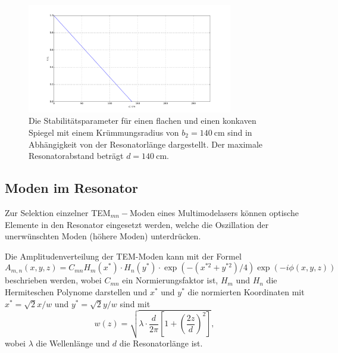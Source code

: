 \begin{figure}
    \centering
    \includegraphics[width=0.8\textwidth]{plots/stability2.pdf}
    \caption{Die Stabilitätsparameter für einen flachen und einen konkaven Spiegel mit einem Krümmungsradius von $b_2 = \SI{140}{\centi\meter}$ sind in Abhängigkeit von der Resonatorlänge dargestellt. Der maximale Resonatorabstand beträgt $d = \SI{140}{\centi\meter}$.}
    \label{fig:stability2}
\end{figure}

\subsection{Moden im Resonator}
\label{sec:model}

Zur Selektion einzelner TEM$_{mn}-$Moden eines Multimodelasers können optische Elemente in den Resonator eingesetzt werden, welche die Oszillation der unerwünschten Moden (höhere Moden) unterdrücken.

Die Amplitudenverteilung der TEM-Moden kann mit der Formel 
\begin{equation}
    A_{m,n}\left(x,y,z\right) = C_{mn} H_m\left(x^*\right)\cdot H_n\left(y^*\right) \cdot \exp\left(-\left( x^{*2} + y^{*2} \right)/4 \right) \exp\left( -i \phi \left( x,y,z \right)\right) 
    \label{eq:amp}
\end{equation}
beschrieben werden, wobei $C_{mn}$ ein Normierungsfaktor ist, $H_m$ und $H_n$ die Hermiteschen Polynome darstellen und $x^*$ und $y^*$ die normierten Koordinaten mit $x^*= \sqrt{2} x/w$ und  $y^*= \sqrt{2} y/w$ sind mit 
\begin{equation*}
    w(z) = \sqrt{\lambda \cdot \frac{d}{2\pi}\left[ 1 + \left(\frac{2z}{d} \right)^2 \right]},
\end{equation*}
wobei $\lambda$ die Wellenlänge und $d$ die Resonatorlänge ist.

